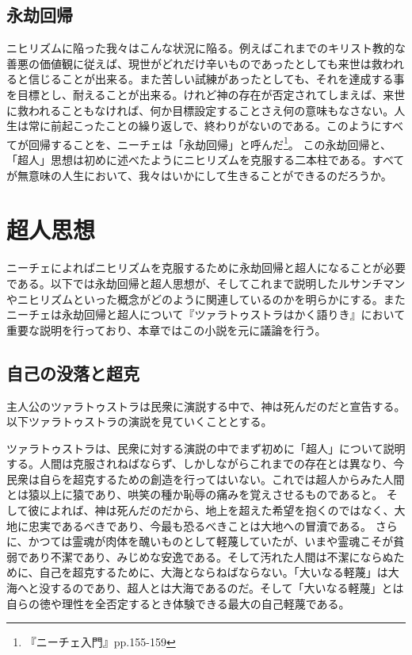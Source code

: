 \documentclass[b5j,twoside,twocolumn]{utarticle}
\begin{document}
\subsection{永劫回帰}
ニヒリズムに陥った我々はこんな状況に陥る。例えばこれまでのキリスト教的な善悪の価値観に従えば、現世がどれだけ辛いものであったとしても来世は救われると信じることが出来る。また苦しい試練があったとしても、それを達成する事を目標とし、耐えることが出来る。けれど神の存在が否定されてしまえば、来世に救われることもなければ、何か目標設定することさえ何の意味もなさない。人生は常に前起こったことの繰り返しで、終わりがないのである。このようにすべてが回帰することを、ニーチェは「永劫回帰」と呼んだ\footnote{『ニーチェ入門』pp.155-159}。
この永劫回帰と、「超人」思想は初めに述べたようにニヒリズムを克服する二本柱である。すべてが無意味の人生において、我々はいかにして生きることができるのだろうか。

\section{超人思想}
ニーチェによればニヒリズムを克服するために永劫回帰と超人になることが必要である。以下では永劫回帰と超人思想が、そしてこれまで説明したルサンチマンやニヒリズムといった概念がどのように関連しているのかを明らかにする。またニーチェは永劫回帰と超人について『ツァラトゥストラはかく語りき』において重要な説明を行っており、本章ではこの小説を元に議論を行う。
\subsection{自己の没落と超克}
主人公のツァラトゥストラは民衆に演説する中で、神は死んだのだと宣告する。以下ツァラトゥストラの演説を見ていくこととする。


ツァラトゥストラは、民衆に対する演説の中でまず初めに「超人」について説明する。人間は克服されねばならず、しかしながらこれまでの存在とは異なり、今民衆は自らを超克するための創造を行ってはいない。これでは超人からみた人間とは猿以上に猿であり、哄笑の種か恥辱の痛みを覚えさせるものであると。
そして彼によれば、神は死んだのだから、地上を超えた希望を抱くのではなく、大地に忠実であるべきであり、今最も恐るべきことは大地への冒瀆である。
さらに、かつては霊魂が肉体を醜いものとして軽蔑していたが、いまや霊魂こそが貧弱であり不潔であり、みじめな安逸である。そして汚れた人間は不潔にならぬために、自己を超克するために、大海とならねばならない。「大いなる軽蔑」は大海へと没するのであり、超人とは大海であるのだ。そして「大いなる軽蔑」とは自らの徳や理性を全否定するとき体験できる最大の自己軽蔑である。
\end{document}

